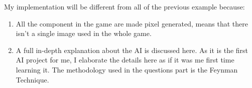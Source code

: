 My implementation will be different from all of the previous example because:
\begin{enumerate}
\item All the component in the game are made pixel generated, means that there isn't a single image used in the whole game.
\item A full in-depth explanation about the AI is discussed here. As it is the first AI project for me, I elaborate the details here as if it was me first time learning it. The methodology used in the questions part is the Feynman Technique.
\end{enumerate}




